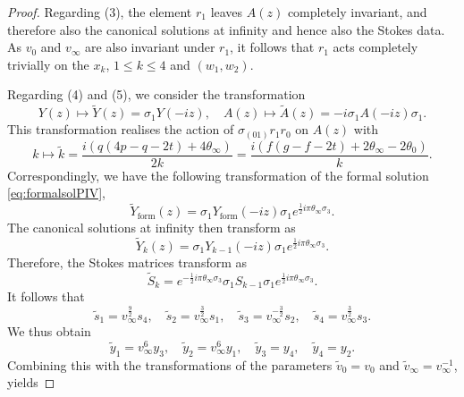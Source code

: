 \documentclass[a4paper,reqno]{amsart}
\numberwithin{equation}{section}
\numberwithin{equation}{section}
\begin{document}
\begin{proof}
Regarding (3), the element $r_1$ leaves $A(z)$ completely invariant, and therefore also the canonical solutions at infinity and hence also the Stokes data. As $v_0$ and $v_\infty$ are also invariant under $r_1$, it follows that $r_1$ acts completely trivially on the $x_k$, $1\leq k\leq 4$ and $(w_1,w_2)$.

Regarding (4) and (5), we consider the transformation
\begin{equation*}
    Y(z)\mapsto \widetilde{Y}(z)=\sigma_1 Y(-iz),\quad A(z)\mapsto \widetilde{A}(z)=-i\sigma_1A(-iz)\sigma_1.
\end{equation*}
This transformation realises the action of $\sigma_{(01)}r_1r_0$ on $A(z)$ with $$k\mapsto \widetilde{k}=\frac{ i\left(q(4 p-q-2 t)+4 \theta _{\infty }\right)}{2 k}=\frac{i \left(f (g-f-2 t)+2 \theta _{\infty }-2 \theta _0\right)}{k}.$$
Correspondingly, we have the following transformation of the formal solution \eqref{eq:formalsolPIV},
\begin{equation*}
   \widetilde{Y}_{\operatorname{form}}(z)=\sigma_1 Y_{\operatorname{form}}(-iz)\sigma_1 e^{\frac{1}{2}i\pi  \theta_\infty\sigma_3}.
\end{equation*}
The canonical solutions at infinity then transform as
\begin{equation*}
   \widetilde{Y}_{k}(z)=\sigma_1 Y_{k-1}(-iz)\sigma_1 e^{\frac{1}{2}i\pi  \theta_\infty\sigma_3}.
\end{equation*}
Therefore, the Stokes matrices transform as
\begin{equation*}
   \widetilde{S}_{k}=e^{-\frac{1}{2}i\pi  \theta_\infty\sigma_3}\sigma_1 S_{k-1}\sigma_1 e^{\frac{1}{2}i\pi  \theta_\infty\sigma_3}.
\end{equation*}
It follows that
\begin{equation*}
        \widetilde{s}_1=v_\infty^{\frac{9}{2}}s_4, \quad 
        \widetilde{s}_2=v_\infty^{\frac{3}{2}}s_1, \quad 
        \widetilde{s}_3=v_\infty^{-\frac{3}{2}}s_2,\quad
        \widetilde{s}_4=v_\infty^{\frac{3}{2}}s_3.
\end{equation*}
We thus obtain
\begin{equation*}
        \widetilde{y}_1=v_\infty^{6}y_3, \quad
        \widetilde{y}_2=v_\infty^{6}y_1,\quad
        \widetilde{y}_3=y_4, \quad
        \widetilde{y}_4=y_2.
\end{equation*}
Combining this with the transformations of the parameters   $\tilde{v}_0=v_0$ and $\tilde{v}_\infty=v_\infty^{-1}$, yields

\end{proof}
\end{document}
